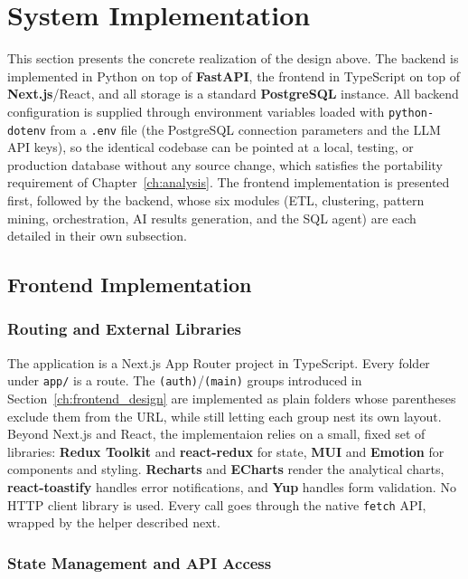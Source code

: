 \section{System Implementation}
\label{ch:system_implementation}

This section presents the concrete realization of the design above. The backend is implemented in Python on top of \textbf{FastAPI}, the frontend in TypeScript on top of \textbf{Next.js}/React, and all storage is a standard \textbf{PostgreSQL} instance. All backend configuration is supplied through environment variables loaded with \texttt{python-dotenv} from a \texttt{.env} file (the PostgreSQL connection parameters and the LLM API keys), so the identical codebase can be pointed at a local, testing, or production database without any source change, which satisfies the portability requirement of Chapter~\ref{ch:analysis}. The frontend implementation is presented first, followed by the backend, whose six modules (ETL, clustering, pattern mining, orchestration, AI results generation, and the SQL agent) are each detailed in their own subsection.

\subsection{Frontend Implementation}
\label{ch:frontend_impl}

\subsubsection*{Routing and External Libraries}

The application is a Next.js App Router project in TypeScript. Every folder under \texttt{app/} is a route. The \texttt{(auth)}/\texttt{(main)} groups introduced in Section~\ref{ch:frontend_design} are implemented as plain folders whose parentheses exclude them from the URL, while still letting each group nest its own layout. Beyond Next.js and React, the implementaion relies on a small, fixed set of libraries: \textbf{Redux Toolkit} and \textbf{react-redux} for state, \textbf{MUI} and \textbf{Emotion} for components and styling. \textbf{Recharts} and \textbf{ECharts} render the analytical charts, \textbf{react-toastify} handles error notifications, and \textbf{Yup} handles form validation. No HTTP client library is used. Every call goes through the native \texttt{fetch} API, wrapped by the helper described next.

\subsubsection*{State Management and API Access}

